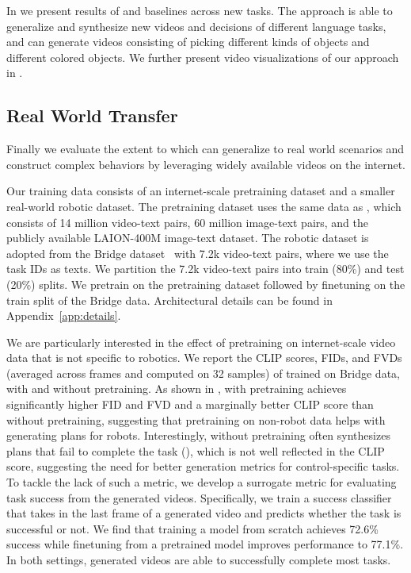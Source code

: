  In  we present results of \model %
and baselines across new tasks. %
The \model approach is able to generalize and synthesize new videos and decisions of different language tasks, and can generate videos consisting of picking different kinds of objects and different colored objects. We further present video visualizations of our approach in .

\subsection{Real World Transfer}
\label{sect:real}


Finally we evaluate the extent to which \model can generalize to real world scenarios and construct complex behaviors by leveraging widely available videos on the internet.

 Our training data consists of an internet-scale pretraining dataset and a smaller real-world robotic dataset. The pretraining dataset uses the same data as \citep{ho2022imagen}, which consists of 14 million video-text pairs, 60 million image-text pairs, and the publicly available LAION-400M image-text dataset. The robotic dataset is adopted from the Bridge dataset~\citep{ebert2021bridge} with 7.2k video-text pairs, where we use the task IDs as texts. We partition the 7.2k video-text pairs into train (80\%) and test (20\%) splits. We pretrain \model on the pretraining dataset followed by finetuning on the train split of the Bridge data. Architectural details can be found in Appendix~\ref{app:details}. 




 We are particularly interested in the effect of pretraining on internet-scale video data that is not specific to robotics. We report the CLIP scores, FIDs, and FVDs (averaged across frames and computed on 32 samples) of \model trained on Bridge data, with and without pretraining. As shown in , \model with pretraining achieves significantly higher FID and FVD and a marginally better CLIP score than \model without pretraining, suggesting that pretraining on non-robot data helps with generating plans for robots. Interestingly, \model without pretraining often synthesizes plans that fail to complete the task (), which is not well reflected in the CLIP score, suggesting the need for better generation metrics for control-specific tasks. To tackle the lack of such a metric, we develop a surrogate metric for evaluating task success from the generated videos. Specifically, we train a success classifier that takes in the last frame of a generated video and predicts whether the task is successful or not. We find that training a model from scratch achieves 72.6\% success while finetuning from a pretrained model improves performance to 77.1\%. In both settings, generated videos are able to successfully complete most tasks.

